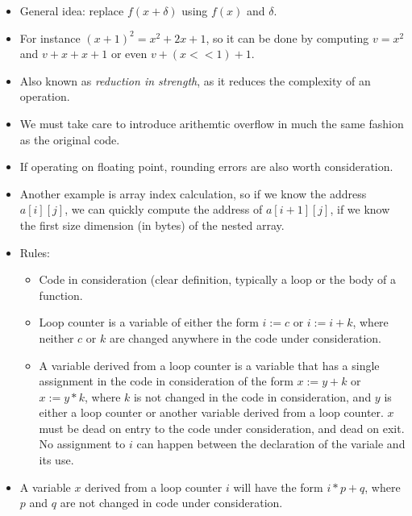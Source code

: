 \begin{itemize}

\item General idea: replace $f(x + \delta)$ using $f(x)$ and $\delta$.

\item For instance $(x+1)^2=x^2+2x+1$, so it can be done by computing $v=x^2$
and $v+x+x+1$ or even $v+(x<<1)+1$.

\item Also known as \emph{reduction in strength}, as it reduces the complexity
of an operation.

\item We must take care to introduce arithemtic overflow in much the same
fashion as the original code.

\item If operating on floating point, rounding errors are also worth
consideration.

\item Another example is array index calculation, so if we know the address
$a[i][j]$, we can quickly compute the address of $a[i+1][j]$, if we know the
first size dimension (in bytes) of the nested array.

\item Rules:

\begin{itemize}

\item Code in consideration (clear definition, typically a loop or the body of
a function.

\item Loop counter is a variable of either the form $i:=c$ or $i:=i+k$, where
neither $c$ or $k$ are changed anywhere in the code under consideration.

\item A variable derived from a loop counter is a variable that has a single
assignment in the code in consideration of the form $x:=y+k$ or $x:=y*k$, where
$k$ is not changed in the code in consideration, and $y$ is either a loop
counter or another variable derived from a loop counter. $x$ must be dead on
entry to the code under consideration, and dead on exit. No assignment to $i$
can happen between the declaration of the variale and its use.

\end{itemize}

\item A variable $x$ derived from a loop counter $i$ will have the form
$i*p+q$, where $p$ and $q$ are not changed in code under consideration.


\end{itemize}
